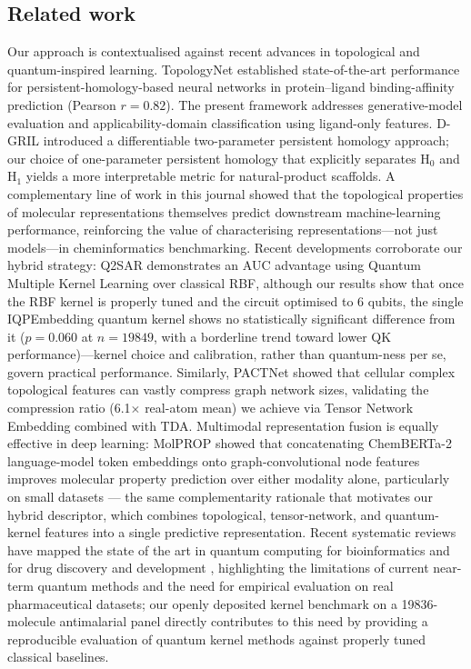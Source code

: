 \documentclass[11pt,a4paper]{article}
\begin{document}
\subsection{Related work}

Our approach is contextualised against recent advances in topological and quantum-inspired learning. TopologyNet \citep{topologynet_2018} established state-of-the-art performance for persistent-homology-based neural networks in protein--ligand binding-affinity prediction (Pearson $r = 0.82$). The present framework addresses generative-model evaluation and applicability-domain classification using ligand-only features. D-GRIL \citep{dgril_2026} introduced a differentiable two-parameter persistent homology approach; our choice of one-parameter persistent homology that explicitly separates H$_0$ and H$_1$ yields a more interpretable metric for natural-product scaffolds. A complementary line of work in this journal \citep{topology_molecular_representations_2025} showed that the topological properties of molecular representations themselves predict downstream machine-learning performance, reinforcing the value of characterising representations---not just models---in cheminformatics benchmarking. Recent developments corroborate our hybrid strategy: Q2SAR \citep{q2sar_2025} demonstrates an AUC advantage using Quantum Multiple Kernel Learning over classical RBF, although our results show that once the RBF kernel is properly tuned and the circuit optimised to 6 qubits, the single IQPEmbedding quantum kernel shows no statistically significant difference from it ($p = \num{0.060}$ at $n = \num{19849}$, with a borderline trend toward lower QK performance)---kernel choice and calibration, rather than quantum-ness per se, govern practical performance. Similarly, PACTNet \citep{pactnet_2025} showed that cellular complex topological features can vastly compress graph network sizes, validating the compression ratio (\num{6.1}$\times$ real-atom mean) we achieve via Tensor Network Embedding combined with TDA. Multimodal representation fusion is equally effective in deep learning: MolPROP \citep{rollins2024molprop} showed that concatenating ChemBERTa-2 language-model token embeddings onto graph-convolutional node features improves molecular property prediction over either modality alone, particularly on small datasets --- the same complementarity rationale that motivates our hybrid descriptor, which combines topological, tensor-network, and quantum-kernel features into a single predictive representation. Recent systematic reviews have mapped the state of the art in quantum computing for bioinformatics \citep{naleczcharkiewicz2024} and for drug discovery and development \citep{kumar2024quantumdrug}, highlighting the limitations of current near-term quantum methods and the need for empirical evaluation on real pharmaceutical datasets; our openly deposited kernel benchmark on a \num{19836}-molecule antimalarial panel directly contributes to this need by providing a reproducible evaluation of quantum kernel methods against properly tuned classical baselines.
\end{document}
